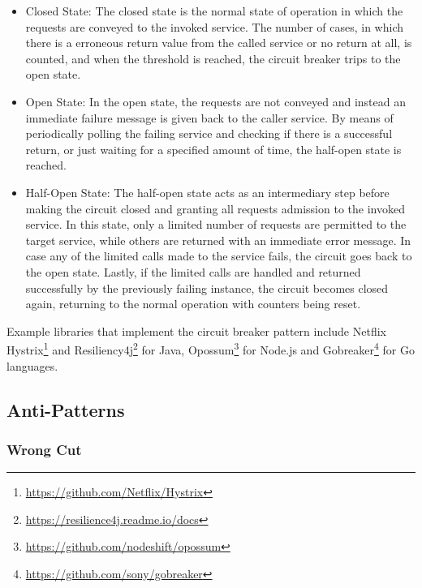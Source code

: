 \documentclass{Configuration_Files/PoliMi3i_thesis}
\begin{document}
\begin{itemize}
    \item Closed State: The closed state is the normal state of operation in which the requests are conveyed to the invoked service. The number of cases, in which there is a erroneous return value from the called service or no return at all, is counted, and when the threshold is reached, the circuit breaker trips to the open state.
    
    \item Open State: In the open state, the requests are not conveyed and instead an immediate failure message is given back to the caller service. By means of periodically polling the failing service and checking if there is a successful return, or just waiting for a specified amount of time, the half-open state is reached.
    
    \item Half-Open State: The half-open state acts as an intermediary step before making the circuit closed and granting all requests admission to the invoked service. In this state, only a limited number of requests are permitted to the target service, while others are returned with an immediate error message. In case any of the limited calls made to the service fails, the circuit goes back to the open state. Lastly, if the limited calls are handled and returned successfully by the previously failing instance, the circuit becomes closed again, returning to the normal operation with counters being reset.
\end{itemize}

Example libraries that implement the circuit breaker pattern include Netflix Hystrix\footnote{\href{https://github.com/Netflix/Hystrix}{https://github.com/Netflix/Hystrix}} and Resiliency4j\footnote{\href{https://resilience4j.readme.io/docs}{https://resilience4j.readme.io/docs}} for Java, Opossum\footnote{\href{https://github.com/nodeshift/opossum}{https://github.com/nodeshift/opossum}} for Node.js and Gobreaker\footnote{\href{https://github.com/sony/gobreaker}{https://github.com/sony/gobreaker}} for Go languages.

\subsection{Anti-Patterns}
\label{subsec:antipattern}


\subsubsection{Wrong Cut}
\label{subsubsec:wrong_cut}
\end{document}
